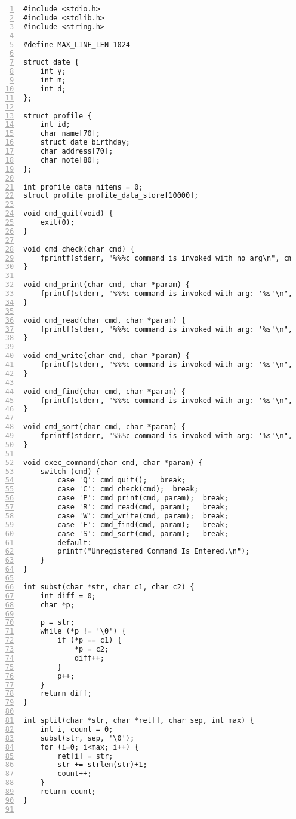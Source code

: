 \documentclass[autodetect-engine,dvi=dvipdfmx,ja=standard,
               a4j,11pt]{bxjsarticle}
\begin{document}
\begin{Verbatim}[numbers=left, xleftmargin=10mm, numbersep=6pt,
  fontsize=\small, baselinestretch=0.8]
#include <stdio.h>
#include <stdlib.h>
#include <string.h>

#define MAX_LINE_LEN 1024

struct date {
    int y;
    int m;
    int d;
};

struct profile {
    int id;
    char name[70];
    struct date birthday;
    char address[70];
    char note[80];
};

int profile_data_nitems = 0;
struct profile profile_data_store[10000];

void cmd_quit(void) {
    exit(0);
}

void cmd_check(char cmd) {
    fprintf(stderr, "%%%c command is invoked with no arg\n", cmd);
}

void cmd_print(char cmd, char *param) {
    fprintf(stderr, "%%%c command is invoked with arg: '%s'\n", cmd, param);
}

void cmd_read(char cmd, char *param) {
    fprintf(stderr, "%%%c command is invoked with arg: '%s'\n", cmd, param);
}

void cmd_write(char cmd, char *param) {
    fprintf(stderr, "%%%c command is invoked with arg: '%s'\n", cmd, param);
}

void cmd_find(char cmd, char *param) {
    fprintf(stderr, "%%%c command is invoked with arg: '%s'\n", cmd, param);
}

void cmd_sort(char cmd, char *param) {
    fprintf(stderr, "%%%c command is invoked with arg: '%s'\n", cmd, param);
}

void exec_command(char cmd, char *param) {
    switch (cmd) {
        case 'Q': cmd_quit();   break;
        case 'C': cmd_check(cmd);  break;
        case 'P': cmd_print(cmd, param);  break;
        case 'R': cmd_read(cmd, param);   break;
        case 'W': cmd_write(cmd, param);  break;
        case 'F': cmd_find(cmd, param);   break;
        case 'S': cmd_sort(cmd, param);   break;
        default:
        printf("Unregistered Command Is Entered.\n");
    }
}

int subst(char *str, char c1, char c2) {
    int diff = 0;
    char *p;

    p = str;
    while (*p != '\0') {
        if (*p == c1) {
            *p = c2;
            diff++;
        }
        p++;
    }
    return diff;
}

int split(char *str, char *ret[], char sep, int max) {
    int i, count = 0;
    subst(str, sep, '\0');
    for (i=0; i<max; i++) {
        ret[i] = str;
        str += strlen(str)+1;
        count++;
    }
    return count;
}


\end{Verbatim}
\end{document}

